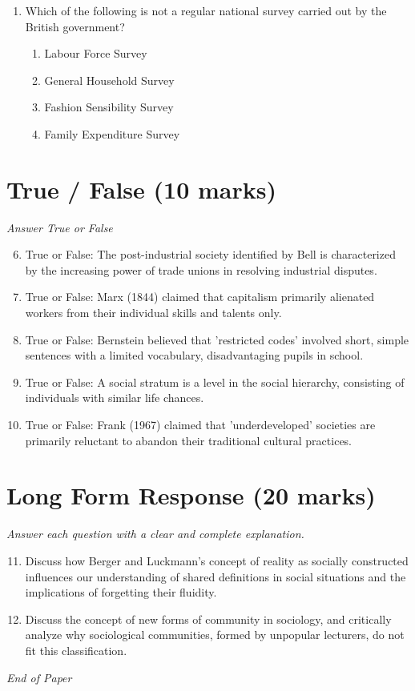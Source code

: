 \documentclass[12pt]{article}
\begin{document}
\begin{enumerate}[label=\arabic*.]
\begin{enumerate}[label=(\alph*)]
    \item Functionalism
    \item Conflict theory
    \item Symbolic interactionism
    \item Role theory
\end{enumerate}
\item Which of the following is not a regular national survey carried out by the British government?
\begin{enumerate}[label=(\alph*)]
    \item Labour Force Survey
    \item General Household Survey
    \item Fashion Sensibility Survey
    \item Family Expenditure Survey
\end{enumerate}
\end{enumerate}

\section*{True / False (10 marks)}
\textit{Answer True or False}
\begin{enumerate}[label=\arabic*.]
\setcounter{enumi}{5}
\item True or False: The post-industrial society identified by Bell is characterized by the increasing power of trade unions in resolving industrial disputes.
\item True or False: Marx (1844) claimed that capitalism primarily alienated workers from their individual skills and talents only.
\item True or False: Bernstein believed that 'restricted codes' involved short, simple sentences with a limited vocabulary, disadvantaging pupils in school.
\item True or False: A social stratum is a level in the social hierarchy, consisting of individuals with similar life chances.
\item True or False: Frank (1967) claimed that 'underdeveloped' societies are primarily reluctant to abandon their traditional cultural practices.
\end{enumerate}

\section*{Long Form Response (20 marks)}
\textit{Answer each question with a clear and complete explanation.}
\begin{enumerate}[label=\arabic*.]
\setcounter{enumi}{10}
\item Discuss how Berger and Luckmann's concept of reality as socially constructed influences our understanding of shared definitions in social situations and the implications of forgetting their fluidity.
\item Discuss the concept of new forms of community in sociology, and critically analyze why sociological communities, formed by unpopular lecturers, do not fit this classification.
\end{enumerate}

\vfill
\noindent\textit{End of Paper}
\end{document}
